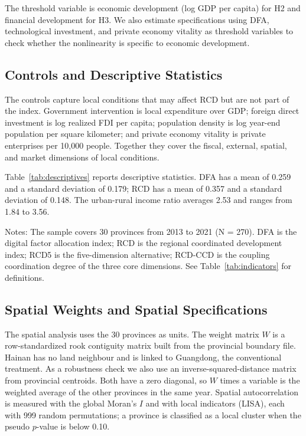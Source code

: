 The threshold variable is economic development (log GDP per capita) for H2 and financial development for H3. We also estimate specifications using DFA, technological investment, and private economy vitality as threshold variables to check whether the nonlinearity is specific to economic development.

\subsection{Controls and Descriptive Statistics}

The controls capture local conditions that may affect RCD but are not part of the index. Government intervention is local expenditure over GDP; foreign direct investment is log realized FDI per capita; population density is log year-end population per square kilometer; and private economy vitality is private enterprises per 10,000 people. Together they cover the fiscal, external, spatial, and market dimensions of local conditions.

Table~\ref{tab:descriptives} reports descriptive statistics. DFA has a mean of 0.259 and a standard deviation of 0.179; RCD has a mean of 0.357 and a standard deviation of 0.148. The urban-rural income ratio averages 2.53 and ranges from 1.84 to 3.56.

\begin{table}[htbp]
\caption{Descriptive statistics.}\label{tab:descriptives}
\begin{threeparttable}
\small

\begin{tablenotes}
\small
\item Notes: The sample covers 30 provinces from 2013 to 2021 (N = 270). DFA is the digital factor allocation index; RCD is the regional coordinated development index; RCD5 is the five-dimension alternative; RCD-CCD is the coupling coordination degree of the three core dimensions. See Table~\ref{tab:indicators} for definitions.
\end{tablenotes}
\end{threeparttable}
\end{table}

\subsection{Spatial Weights and Spatial Specifications}\label{sec:spatial}

The spatial analysis uses the 30 provinces as units. The weight matrix $W$ is a row-standardized rook contiguity matrix built from the provincial boundary file. Hainan has no land neighbour and is linked to Guangdong, the conventional treatment. As a robustness check we also use an inverse-squared-distance matrix from provincial centroids. Both have a zero diagonal, so $W$ times a variable is the weighted average of the other provinces in the same year. Spatial autocorrelation is measured with the global Moran's $I$ and with local indicators (LISA), each with 999 random permutations; a province is classified as a local cluster when the pseudo $p$-value is below 0.10.

